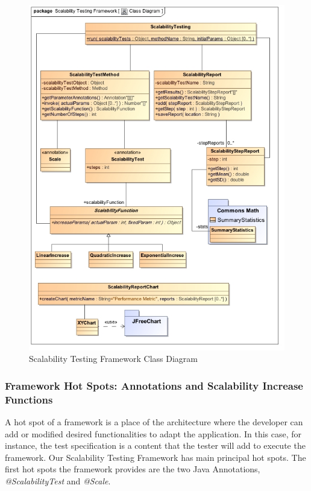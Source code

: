 \begin{figure}[htbp]
\begin{center}
	\includegraphics[scale=0.75]{images/classDiagram.jpg}
\caption{Scalability Testing Framework Class Diagram}
\label{classDiagram}
\end{center}
\end{figure}

\subsubsection{Framework Hot Spots: Annotations and Scalability Increase Functions}
A hot spot of a framework is a place of the architecture where the developer can add or modified desired functionalities to adapt the application. In this case, for instance, the test specification is a content that the tester will add to execute the framework. Our Scalability Testing Framework has main principal hot spots.  The first hot spots the framework provides are the two Java Annotations, \emph{@ScalabilityTest} and \emph{@Scale}.


